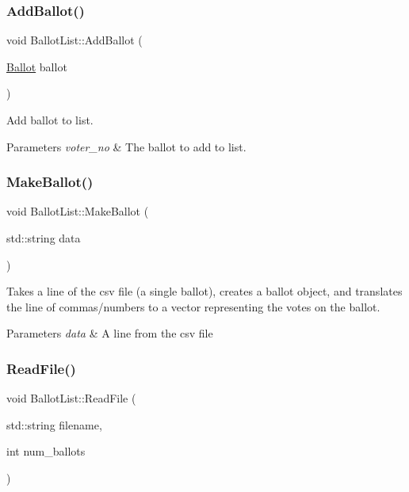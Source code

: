 \subsubsection{\texorpdfstring{Add\+Ballot()}{AddBallot()}}
{\footnotesize\ttfamily void Ballot\+List\+::\+Add\+Ballot (\begin{DoxyParamCaption}\item[{\mbox{\hyperlink{class_ballot}{Ballot}}}]{ballot }\end{DoxyParamCaption})}



Add ballot to list. 


\begin{DoxyParams}{Parameters}
{\em voter\+\_\+no} & The ballot to add to list. \\
\hline
\end{DoxyParams}
\mbox{\label{class_ballot_list_a928e7b3bbe5ae7607944e58ce84d35e7}} 
\subsubsection{\texorpdfstring{Make\+Ballot()}{MakeBallot()}}
{\footnotesize\ttfamily void Ballot\+List\+::\+Make\+Ballot (\begin{DoxyParamCaption}\item[{std\+::string}]{data }\end{DoxyParamCaption})}



Takes a line of the csv file (a single ballot), creates a ballot object, and translates the line of commas/numbers to a vector representing the votes on the ballot. 


\begin{DoxyParams}{Parameters}
{\em data} & A line from the csv file \\
\hline
\end{DoxyParams}
\mbox{\label{class_ballot_list_a144f4d103b5fca451e2917656414951d}} 
\subsubsection{\texorpdfstring{Read\+File()}{ReadFile()}}
{\footnotesize\ttfamily void Ballot\+List\+::\+Read\+File (\begin{DoxyParamCaption}\item[{std\+::string}]{filename,  }\item[{int}]{num\+\_\+ballots }\end{DoxyParamCaption})}



